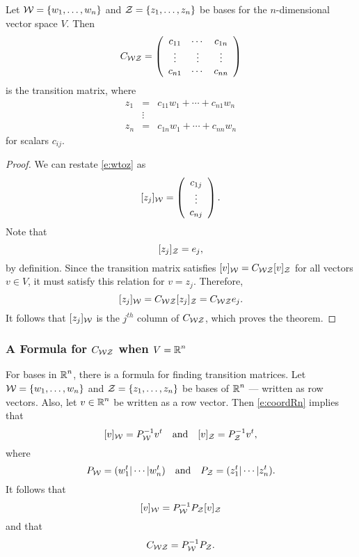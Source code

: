 \documentclass{ximera}
\begin{document}
\begin{theorem}  \label{T:coordform}
Let ${\cal W}=\{w_1,\ldots,w_n\}$ and ${\cal Z}=\{z_1,\ldots,z_n\}$
be bases for the $n$-dimensional vector space $V$.
Then
\begin{equation} \label{e:coordform}
C_{{\cal W}{\cal Z}} =
\left(\begin{array}{ccc} c_{11} & \cdots & c_{1n} \\
\vdots & \vdots & \vdots \\
c_{n1} & \cdots & c_{nn} \end{array}\right)
\end{equation}
is the transition matrix, where
\begin{equation} \label{e:wtoz}
\begin{array}{ccc}
z_1 & = & c_{11}w_1 + \cdots + c_{n1}w_n  \\
    & \vdots &  \\
z_n & = & c_{1n}w_1 + \cdots + c_{nn}w_n 
\end{array}
\end{equation}
for scalars $c_{ij}$.
\end{theorem}

\begin{proof}
We can restate \eqref{e:wtoz} as
\[
[z_j]_{\cal W} = \left(\begin{array}{c} c_{1j} \\ \vdots \\c_{nj}
\end{array} \right).
\]
Note that
\[
[z_j]_{\cal Z} = e_j,
\]
by definition.  Since the transition matrix satisfies
$[v]_{\cal W} =  C_{{\cal W}{\cal Z}}[v]_{\cal Z}$ for all vectors
$v\in V$, it must satisfy this relation for $v=z_j$.  Therefore,
\[
[z_j]_{\cal W} = C_{{\cal W}{\cal Z}}[z_j]_{\cal Z} = C_{{\cal W}{\cal Z}}e_j.
\]
It follows that $[z_j]_{\cal W}$ is the $j^{th}$ column of
$C_{{\cal W}{\cal Z}}$, which proves the theorem.  \end{proof}

\subsubsection*{A Formula for $C_{\cal WZ}$ when $V=\mbox{$\Bbb{R}$}^n$}

For bases in $\mbox{$\Bbb{R}$}^n$, there is a formula for finding transition
matrices.  Let ${\cal W} =\{w_1,\ldots,w_n\}$
and ${\cal Z} = \{z_1,\ldots,z_n\}$ be bases of $\mbox{$\Bbb{R}$}^n$ --- written as row
vectors.
Also, let $v\in\mbox{$\Bbb{R}$}^n$ be written as a row vector.  Then \eqref{e:coordRn}
implies that
\[
[v]_{\cal W} = P_{\cal W}^{-1} v^t \quad\mbox{and}\quad [v]_{\cal Z} = P_{\cal Z}^{-1} v^t,
\]
where
\[
P_{\cal W} = (w_1^t|\cdots|w_n^t) \quad\mbox{and}\quad  P_{\cal Z} = (z_1^t|\cdots|z_n^t).
\]
It follows that
\[
[v]_{\cal W} = P_{\cal W}^{-1} P_{\cal Z} [v]_{\cal Z}
\]
and that
\begin{equation} \label{e:coordformn}
C_{\cal WZ} = P_{\cal W}^{-1} P_{\cal Z}.
\end{equation}
\end{document}
